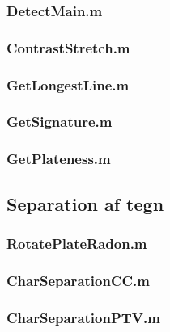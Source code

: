 \documentclass[11pt,a4paper,final]{article}
\begin{document}
\subsubsection{DetectMain.m}
\label{code:DetectMain}


\subsubsection{ContrastStretch.m}
\label{code:ContrastStretch}


\subsubsection{GetLongestLine.m}
\label{code:GetLongestLine}


\subsubsection{GetSignature.m}
\label{code:GetSignature}


\subsubsection{GetPlateness.m}
\label{code:GetPlateness}



\subsection{Separation af tegn}
\subsubsection{RotatePlateRadon.m}
\label{code:RotatePlateRadon}


\subsubsection{CharSeparationCC.m}
\label{code:CharSeparationCC}


\subsubsection{CharSeparationPTV.m}
\label{code:CharSeparationPTV}

\end{document}
